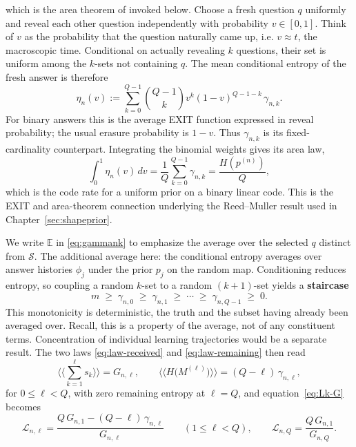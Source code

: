 \documentclass[11pt]{article}
\begin{document}
which is the area theorem of \cite{ashikhmin04} invoked below.
Choose a fresh question $q$ uniformly and reveal each other question
independently with probability $v\in[0,1]$. Think of $v$ as the probability that
the question naturally came up, i.e. $v \approx t$, the macroscopic time. Conditional
on actually revealing $k$ questions, their set is uniform among the $k$-sets
not containing $q$. The mean conditional entropy of the fresh answer
is therefore
\begin{equation}\label{eq:exit-eta}
  \eta_n(v):=\sum_{k=0}^{Q-1}\binom{Q-1}{k}
       v^k(1-v)^{Q-1-k}\,\gamma_{n,k}.
\end{equation}
For binary answers this is the average EXIT function expressed in
reveal probability; the usual erasure probability is $1-v$.
Thus $\gamma_{n,k}$ is its fixed-cardinality counterpart. Integrating
the binomial weights gives its area law,
\[
  \int_0^1\eta_n(v)\,dv
  =\frac1Q\sum_{k=0}^{Q-1}\gamma_{n,k}
  =\frac{H(p^{(n)})}{Q},
\]
which is the code rate for a uniform prior on a binary linear code.
This is the EXIT and area-theorem connection underlying the
Reed--Muller result used in Chapter~\ref{sec:shapeprior}.

We write $\mathbb{E}$ in \eqref{eq:gammank} to emphasize the average over the selected $q$ distinct from $\mathcal{S}$. 
The additional average here: the conditional entropy
averages over answer histories $\phi_j$ under the prior $p_j$ on the random map. 
Conditioning reduces entropy, so coupling a
random $k$-set to a random $(k{+}1)$-set yields a \textbf{staircase}
%
\begin{equation}
  m \;\ge\; \gamma_{n,0} \;\ge\; \gamma_{n,1} \;\ge\; \cdots
  \;\ge\; \gamma_{n,Q-1} \;\ge\; 0 .
  \label{eq:gammamono}
\end{equation}
%
This monotonicity is deterministic, the truth and the subset having
already been averaged over. Recall, this is a property of the average, not of any constituent terms.
Concentration of individual learning trajectories would be a separate
result. The two laws \eqref{eq:law-received} and
\eqref{eq:law-remaining} then read
%
\begin{equation}
  \Big\langle\!\Big\langle \sum_{k=1}^{\ell} s_k \Big\rangle\!\Big\rangle = G_{n,\ell},
  \qquad
  \big\langle\!\big\langle H\big(M^{(\ell)}\big) \big\rangle\!\big\rangle
  = (Q-\ell)\,\gamma_{n,\ell},
  \label{eq:finitelaws}
\end{equation}
%
for $0 \le \ell < Q$, with zero remaining entropy at $\ell = Q$, and
equation~\eqref{eq:Lk-G} becomes
%
\begin{equation}
  \mathcal L_{n,\ell}
  = \frac{Q\,G_{n,1} - (Q-\ell)\,\gamma_{n,\ell}}{G_{n,\ell}}
  \qquad (1 \le \ell < Q),
  \qquad
  \mathcal L_{n,Q} = \frac{Q\,G_{n,1}}{G_{n,Q}} .
  \label{eq:finitelev}
\end{equation}
\end{document}

